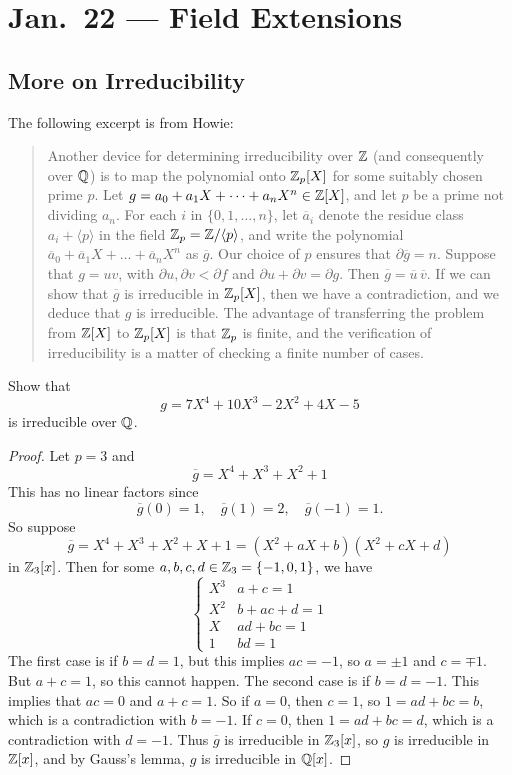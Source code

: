 \chapter{Jan.~22 --- Field Extensions}
\section{More on Irreducibility}
The following excerpt is from Howie:
\begin{quote}
  Another device for determining irreducibility over $\mathbb{Z}$ (and consequently over $\mathbb{Q}$) is to map the polynomial onto $\mathbb{Z}_p[X]$ for some suitably chosen prime $p$. Let $g = a_0 +a_1X + \dots +a_nX^n \in \mathbb{Z}[X]$, and let $p$ be a prime not dividing $a_n$. For each $i$ in $\{0, 1, \dots, n\}$, let $\overline{a}_i$ denote the residue class $a_i + \langle p \rangle$ in the field $\mathbb{Z}_p = \mathbb{Z} / \langle p \rangle$, and write the polynomial $\overline{a}_0 + \overline{a}_1X + \dots + \overline{a}_n X^n$ as $\overline{g}$. Our choice of $p$ ensures that $\partial \overline{g} = n$. Suppose that $g = uv$, with $\partial u, \partial v < \partial f$ and $\partial u + \partial v = \partial g$. Then $\overline{g} = \overline{u}\,\overline{v}$. If we can show that $\overline{g}$ is irreducible in $\mathbb{Z}_p[X]$, then we have a contradiction, and we deduce that $g$ is irreducible. The advantage of transferring the problem from $\mathbb{Z}[X]$ to $\mathbb{Z}_p[X]$ is that $\mathbb{Z}_p$ is finite, and the verification of irreducibility is a matter of checking a finite number of cases.
\end{quote}

\begin{example}
  Show that
  \[g = 7X^4 + 10X^3 - 2X^2 + 4X - 5\]
  is irreducible over $\mathbb{Q}$.
\end{example}

\begin{proof}
  Let $p = 3$ and
  \[\overline{g} = X^4 + X^3 + X^2 + 1\]
  This has no linear factors since
  \[\overline{g}(0) = 1, \quad \overline{g}(1) = 2, \quad \overline{g}(-1) = 1.\]
  So suppose
  \[
    \overline{g} = X^4 + X^3 + X^2 + X + 1
    = (X^2 + aX + b)(X^2 + cX + d)
  \]
  in $\mathbb{Z}_3[x]$. Then for some
  $a, b, c, d \in \mathbb{Z}_3 = \{-1, 0, 1\}$, we have
  \[
    \begin{cases}
      X^3 & a + c = 1 \\
      X^2 & b + ac + d = 1 \\
      X & ad + bc = 1 \\
      1 & bd = 1
    \end{cases}
  \]
  The first case is if $b = d = 1$, but this
  implies $ac = -1$, so $a = \pm 1$ and $c = \mp 1$.
  But $a + c = 1$, so this cannot happen. The
  second case is if $b = d = -1$. This implies
  that $ac = 0$ and $a + c = 1$. So if $a = 0$,
  then $c = 1$, so $1 = ad + bc = b$, which is
  a contradiction with $b = -1$. If $c = 0$,
  then $1 = ad + bc = d$, which is a contradiction
  with $d = -1$. Thus $\overline{g}$ is irreducible
  in $\mathbb{Z}_3[x]$, so $g$ is irreducible in $\mathbb{Z}[x]$,
  and by Gauss's lemma, $g$ is irreducible in $\mathbb{Q}[x]$.
\end{proof}

